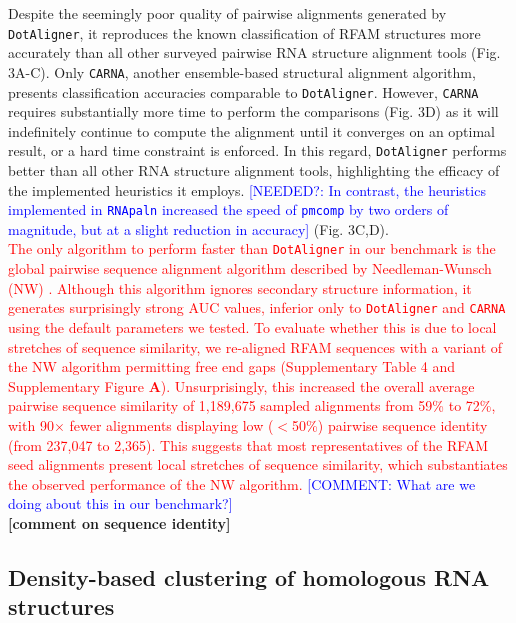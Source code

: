 \documentclass{bmcart}
\newcommand\dotaligner{\texttt{DotAligner}}
\newcommand\carna{\texttt{CARNA}}
\begin{document}
Despite the seemingly poor quality of pairwise alignments generated by \dotaligner{}, it 
reproduces the known classification of RFAM structures more accurately than all 
other surveyed pairwise RNA structure alignment tools (Fig. 3A-C). Only \carna{}, 
another ensemble-based structural alignment algorithm, presents classification accuracies
comparable to \dotaligner{}. However, \carna{} requires substantially more time to perform 
the comparisons (Fig. 3D) as it will indefinitely continue to compute the alignment
until it converges on an optimal result, or a hard time constraint is enforced.  
In this regard, \dotaligner{} performs better than all other RNA structure alignment tools, 
highlighting the efficacy of the implemented heuristics it employs. 
\textcolor{blue} {[NEEDED?: In contrast, the heuristics implemented in \texttt{RNApaln} increased the speed of 
\texttt{pmcomp} by two orders of magnitude, but at a slight reduction in accuracy]} (Fig. 3C,D). \\

\textcolor{red} {The only algorithm to perform faster than \dotaligner{} in our benchmark is the global pairwise 
sequence alignment algorithm described by Needleman-Wunsch (NW) \cite{needleman1970general}. 
Although this algorithm ignores secondary structure information, it generates surprisingly strong
AUC values, inferior only to \dotaligner{} and \carna{} using the default parameters we tested.  
To evaluate whether this is due to local stretches of sequence similarity, we re-aligned RFAM 
sequences with a variant of the NW algorithm permitting free end gaps (Supplementary Table 4 
and Supplementary Figure \textbf{A}).  
Unsurprisingly, this increased the overall average pairwise sequence similarity of 1,189,675 sampled 
alignments from 59\% to 72\%, with 90$\times$ fewer alignments displaying low ($<$50\%) pairwise 
sequence identity (from 237,047 to 2,365). This suggests that most representatives of  the RFAM 
seed alignments present local stretches of sequence similarity, which substantiates 
the observed performance of the NW algorithm.} \textcolor{blue} {[COMMENT: What are we doing about this in our benchmark?]} \\

\textbf{[comment on sequence identity]}

\subsection*{Density-based clustering of homologous RNA structures}
\end{document}
